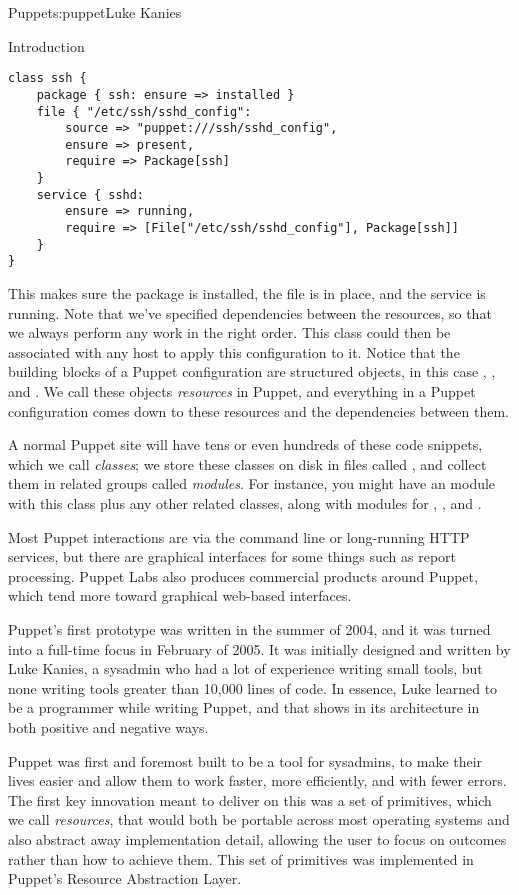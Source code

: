 \begin{aosachapter}{Puppet}{s:puppet}{Luke Kanies}
\begin{aosasect1}{Introduction}
\begin{verbatim}
class ssh {
    package { ssh: ensure => installed }
    file { "/etc/ssh/sshd_config":
        source => "puppet:///ssh/sshd_config",
        ensure => present,
        require => Package[ssh]
    }
    service { sshd:
        ensure => running,
        require => [File["/etc/ssh/sshd_config"], Package[ssh]]
    }
}
\end{verbatim}

\noindent This makes sure the package is installed, the file is in place, and
the service is running.  Note that we've specified dependencies
between the resources, so that we always perform any work in the right
order.  This class could then be associated with any host to apply
this configuration to it.  Notice that the building blocks of a Puppet
configuration are structured objects, in this case , ,
and .  We call these objects \emph{resources} in Puppet, and
everything in a Puppet configuration comes down to these resources and
the dependencies between them.

A normal Puppet site will have tens or even hundreds of these code
snippets, which we call \emph{classes}; we store these classes on disk in
files called , and collect them in related groups called
\emph{modules}. For instance, you might have an  module with this
 class plus any other related classes, along with modules for
, , and .

Most Puppet interactions are via the command line or long-running HTTP
services, but there are graphical interfaces for some things such as
report processing.  Puppet Labs also produces commercial products
around Puppet, which tend more toward graphical web-based interfaces.

Puppet's first prototype was written in the summer of 2004, and it was
turned into a full-time focus in February of 2005.  It was initially
designed and written by Luke Kanies, a sysadmin who had a lot of
experience writing small tools, but none writing tools greater than
10,000 lines of code.  In essence, Luke learned to be a programmer
while writing Puppet, and that shows in its architecture in both positive and negative
ways.

Puppet was first and foremost built to be a tool for sysadmins, to 
make their lives easier and allow them to work
faster, more efficiently, and with fewer errors.  The first key
innovation meant to deliver on this was a set of primitives, which we
call \emph{resources}, that would both be portable across most operating
systems and also abstract away implementation detail, allowing the
user to focus on outcomes rather than how to achieve them.  This set
of primitives was implemented in Puppet's Resource Abstraction Layer.


\end{aosasect1}
\end{aosachapter}
